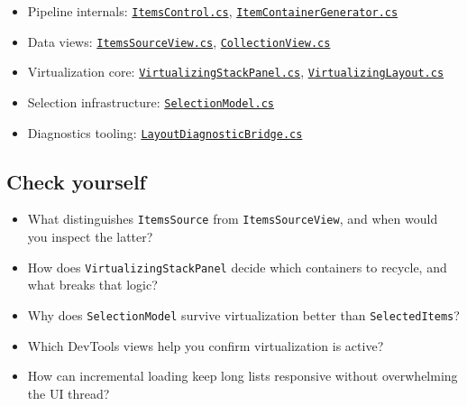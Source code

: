 \begin{itemize}
\tightlist
\item
  Pipeline internals:
  \href{https://github.com/AvaloniaUI/Avalonia/blob/master/src/Avalonia.Controls/ItemsControl.cs}{\passthrough{\lstinline!ItemsControl.cs!}},
  \href{https://github.com/AvaloniaUI/Avalonia/blob/master/src/Avalonia.Controls/Generators/ItemContainerGenerator.cs}{\passthrough{\lstinline!ItemContainerGenerator.cs!}}
\item
  Data views:
  \href{https://github.com/AvaloniaUI/Avalonia/blob/master/src/Avalonia.Controls/ItemsSourceView.cs}{\passthrough{\lstinline!ItemsSourceView.cs!}},
  \href{https://github.com/AvaloniaUI/Avalonia/blob/master/src/Avalonia.Base/Data/Core/CollectionView.cs}{\passthrough{\lstinline!CollectionView.cs!}}
\item
  Virtualization core:
  \href{https://github.com/AvaloniaUI/Avalonia/blob/master/src/Avalonia.Controls/VirtualizingStackPanel.cs}{\passthrough{\lstinline!VirtualizingStackPanel.cs!}},
  \href{https://github.com/AvaloniaUI/Avalonia/blob/master/src/Avalonia.Controls/ItemsRepeater/Layout/VirtualizingLayout.cs}{\passthrough{\lstinline!VirtualizingLayout.cs!}}
\item
  Selection infrastructure:
  \href{https://github.com/AvaloniaUI/Avalonia/blob/master/src/Avalonia.Controls/Selection/SelectionModel.cs}{\passthrough{\lstinline!SelectionModel.cs!}}
\item
  Diagnostics tooling:
  \href{https://github.com/AvaloniaUI/Avalonia/blob/master/src/Avalonia.Diagnostics/Diagnostics/LayoutDiagnosticBridge.cs}{\passthrough{\lstinline!LayoutDiagnosticBridge.cs!}}
\end{itemize}

\subsection{Check yourself}\label{check-yourself-12}

\begin{itemize}
\tightlist
\item
  What distinguishes \passthrough{\lstinline!ItemsSource!} from
  \passthrough{\lstinline!ItemsSourceView!}, and when would you inspect
  the latter?
\item
  How does \passthrough{\lstinline!VirtualizingStackPanel!} decide which
  containers to recycle, and what breaks that logic?
\item
  Why does \passthrough{\lstinline!SelectionModel!} survive
  virtualization better than \passthrough{\lstinline!SelectedItems!}?
\item
  Which DevTools views help you confirm virtualization is active?
\item
  How can incremental loading keep long lists responsive without
  overwhelming the UI thread?
\end{itemize}


